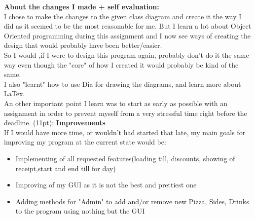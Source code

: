 \documentclass[11pt,a4paper]{article}
\begin{document}
\begin{flushleft}
\vspace{11pt}
\textbf{About the changes I made + self evaluation:}\\
I chose to make the changes to the given class diagram and create it the way I did as it seemed  to be the most reasonable for me. But I learn a lot about Object Oriented programming during this assignment and I now see ways of creating the design that would probably have been better/easier.\\
So I would ,if I were to design this program again, probably don't do it the same way even though the "core" of how I created it would probably be kind of the same. \\
I also "learnt" how to use Dia for drawing the diagrams, and learn more about LaTex.\\
An other important point I learn was to start as early as possible with an assignment in order to prevent myself from a very stressful time right before the deadline. 
\vline(11pt);
\textbf{Improvements}\\
If I would have more time, or wouldn't had started that late, my main goals for improving my program at the current state would be:
\begin{itemize}
\item Implementing of all requested features(loading till, discounts, showing of receipt,start and end till for day)
\item Improving of my GUI as it is not the best and prettiest one
\item Adding methods for "Admin" to add and/or remove new Pizza, Sides, Drinks to the program using nothing but the GUI
\end{itemize}
\vspace{11pt}


\end{flushleft}
\end{document}
